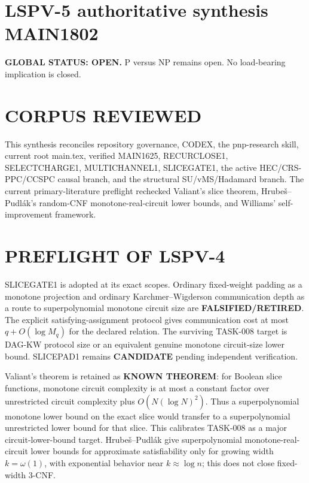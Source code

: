 \documentclass[11pt]{article}
\begin{document}
\section*{LSPV-5 authoritative synthesis MAIN1802}
\textbf{GLOBAL STATUS: OPEN.} P versus NP remains open. No load-bearing implication is closed.

\section*{CORPUS REVIEWED}
This synthesis reconciles repository governance, CODEX, the pnp-research skill, current root main.tex, verified MAIN1625, RECURCLOSE1, SELECTCHARGE1, MULTICHANNEL1, SLICEGATE1, the active HEC/CRS-PPC/CCSPC causal branch, and the structural SU/vMS/Hadamard branch. The current primary-literature preflight rechecked Valiant's slice theorem, Hrube\v{s}--Pudl\'ak's random-CNF monotone-real-circuit lower bounds, and Williams' self-improvement framework.

\section*{PREFLIGHT OF LSPV-4}
SLICEGATE1 is adopted at its exact scopes. Ordinary fixed-weight padding as a monotone projection and ordinary Karchmer--Wigderson communication depth as a route to superpolynomial monotone circuit size are \textbf{FALSIFIED/RETIRED}. The explicit satisfying-assignment protocol gives communication cost at most $q+O(\log M_q)$ for the declared relation. The surviving TASK-008 target is DAG-KW protocol size or an equivalent genuine monotone circuit-size lower bound. SLICEPAD1 remains \textbf{CANDIDATE} pending independent verification.

Valiant's theorem is retained as \textbf{KNOWN THEOREM}: for Boolean slice functions, monotone circuit complexity is at most a constant factor over unrestricted circuit complexity plus $O(N(\log N)^2)$. Thus a superpolynomial monotone lower bound on the exact slice would transfer to a superpolynomial unrestricted lower bound for that slice. This calibrates TASK-008 as a major circuit-lower-bound target. Hrube\v{s}--Pudl\'ak give superpolynomial monotone-real-circuit lower bounds for approximate satisfiability only for growing width $k=\omega(1)$, with exponential behavior near $k\approx\log n$; this does not close fixed-width 3-CNF.
\end{document}
